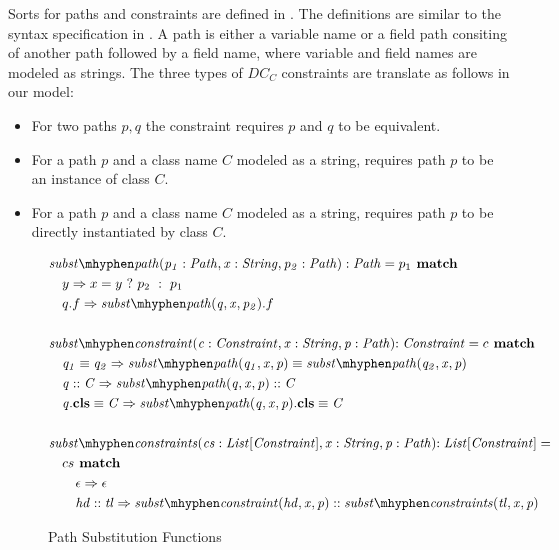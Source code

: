Sorts for paths and constraints are defined in .
The definitions are similar to the syntax specification in .
A path is either a variable name or a field path consiting
of another path followed by a field name, where variable and field names
are modeled as strings.
The three types of $DC_C$ constraints are translate as follows in our model:
\begin{itemize}
  \item For two paths $p, q$ the constraint  requires $p$ and $q$
        to be equivalent.
  \item For a path $p$ and a class name $C$ modeled as a string,
         requires path $p$ to be an instance of class $C$.
  \item For a path $p$ and a class name $C$ modeled as a string,
         requires path $p$ to be directly instantiated by class $C$.
\end{itemize}\quad
\begin{figure}[t]
\centering
\begin{align*}
&\substpath{p_1: Path}{x: String}{p_2: Path}:\mIt{Path} = p_1 \match\\
&\quad y \Rightarrow \ite{x=y}{p_2}{p_1}\\
&\quad q.f \Rightarrow \substpath{q}{x}{p_2}.f\\
\\
&\substconstr{c: Constraint}{x: String}{p: Path}\mathit{: Constraint} = c \match \\
&\quad \case{\pathEq{q_1}{q_2}}
  {\pathEq
    {\substpath{q_1}{x}{p}}
    {\substpath{q_2}{x}{p}}}\\
&\quad \case{\instOf{q}{C}}
  {\instOf{\substpath{q}{x}{p}}{C}}\\
&\quad \case{\instBy{q}{C}}
  {\instBy{\substpath{q}{x}{p}}{C}}\\\\
&\substconstrs{cs: List[Constraint]}{x: String}{p: Path}\mathit{: List[Constraint]} =\\
&\quad cs \match\\
&\qquad \case{\epsilon}{\epsilon}\\
&\qquad \case{hd :: tl}
  {\substconstr{hd}{x}{p} ::
  \substconstrs{tl}{x}{p}}
\end{align*}
\caption{Path Substitution Functions}
\label{subfig:axioms-naive-general-funs}
\end{figure}\\
